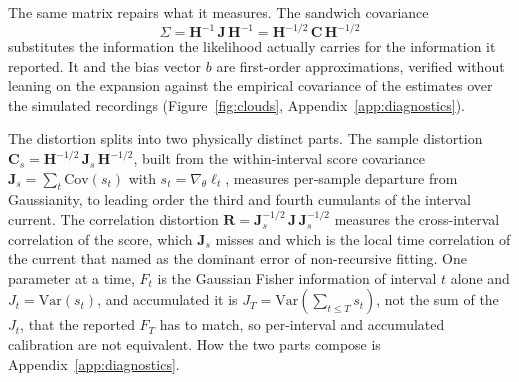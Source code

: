 The same matrix repairs what it measures. The sandwich covariance \cite{huber1967behavior,godambe1960optimum}
\[ \Sigma=\mathbf{H}^{-1}\,\mathbf{J}\,\mathbf{H}^{-1}=\mathbf{H}^{-1/2}\,\mathbf{C}\,\mathbf{H}^{-1/2} \]
substitutes the information the likelihood actually carries for the information it reported. It and
the bias vector $b$ are first-order approximations, verified without leaning on the expansion
against the empirical covariance of the estimates over the simulated recordings
(Figure~\ref{fig:clouds}, Appendix~\ref{app:diagnostics}).

The distortion splits into two physically distinct parts.
The sample distortion $\mathbf{C}_s=\mathbf{H}^{-1/2}\,\mathbf{J}_s\,\mathbf{H}^{-1/2}$, built from
the within-interval score covariance $\mathbf{J}_s=\sum_t\mathrm{Cov}(s_t)$ with
$s_t=\nabla_\theta\ell_t$, measures per-sample departure from Gaussianity, to leading order the
third and fourth cumulants of the interval current. The correlation distortion
$\mathbf{R}=\mathbf{J}_s^{-1/2}\,\mathbf{J}\,\mathbf{J}_s^{-1/2}$ measures the cross-interval
correlation of the score, which $\mathbf{J}_s$ misses and which is the local time correlation of the
current that \cite{milescu2005maximum} named as the dominant error of non-recursive fitting. One
parameter at a time, $F_t$ is the Gaussian Fisher information of interval $t$ alone and
$J_t=\mathrm{Var}(s_t)$, and accumulated it is $J_T=\mathrm{Var}(\sum_{t\le T}s_t)$, not the sum of
the $J_t$, that the reported $F_T$ has to match, so per-interval and accumulated calibration are not
equivalent. How the two parts compose is Appendix~\ref{app:diagnostics}.

